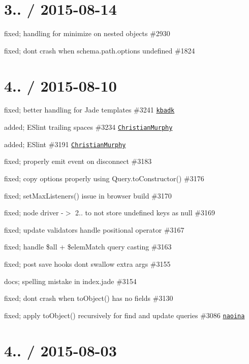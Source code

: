 \section*{3.. / 2015-\/08-\/14 }


\begin{DoxyItemize}
\item fixed; handling for minimize on nested objects \#2930
\item fixed; don\textquotesingle{}t crash when schema.\+path.\+options undefined \#1824
\end{DoxyItemize}

\section*{4.. / 2015-\/08-\/10 }


\begin{DoxyItemize}
\item fixed; better handling for Jade templates \#3241 \href{https://github.com/kbadk}{\tt kbadk}
\item added; E\+Slint trailing spaces \#3234 \href{https://github.com/ChristianMurphy}{\tt Christian\+Murphy}
\item added; E\+Slint \#3191 \href{https://github.com/ChristianMurphy}{\tt Christian\+Murphy}
\item fixed; properly emit event on disconnect \#3183
\item fixed; copy options properly using Query.\+to\+Constructor() \#3176
\item fixed; set\+Max\+Listeners() issue in browser build \#3170
\item fixed; node driver -\/$>$ 2.. to not store undefined keys as null \#3169
\item fixed; update validators handle positional operator \#3167
\item fixed; handle \$all + \$elem\+Match query casting \#3163
\item fixed; post save hooks don\textquotesingle{}t swallow extra args \#3155
\item docs; spelling mistake in index.\+jade \#3154
\item fixed; don\textquotesingle{}t crash when to\+Object() has no fields \#3130
\item fixed; apply to\+Object() recursively for find and update queries \#3086 \href{https://github.com/naoina}{\tt naoina}
\end{DoxyItemize}

\section*{4.. / 2015-\/08-\/03 }


